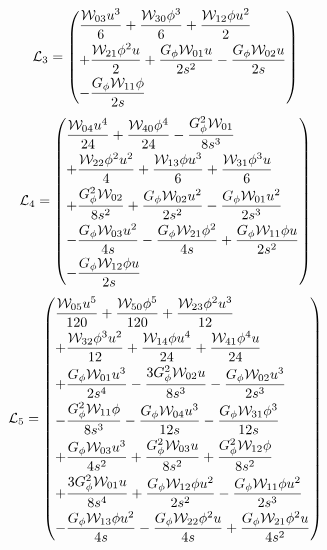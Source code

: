 \documentclass[11pt,a4paper]{article}
\begin{document}
\begin{equation}
\mathcal L_{3}=\left(\vcenter{\hbox{\shortstack[l]{$\displaystyle \frac{\mathcal W_{03} u^{3}}{6} + \frac{\mathcal W_{30} \phi^{3}}{6} + \frac{\mathcal W_{12} \phi u^{2}}{2}$\\
$\displaystyle + \frac{\mathcal W_{21} \phi^{2} u}{2} + \frac{G_{\phi} \mathcal W_{01} u}{2 s^{2}} - \frac{G_{\phi} \mathcal W_{02} u}{2 s}$\\
$\displaystyle - \frac{G_{\phi} \mathcal W_{11} \phi}{2 s}$}}}\right)
\label{eq:cat-local-L-3}
\end{equation}
\begin{equation}
\mathcal L_{4}=\left(\vcenter{\hbox{\shortstack[l]{$\displaystyle \frac{\mathcal W_{04} u^{4}}{24} + \frac{\mathcal W_{40} \phi^{4}}{24} - \frac{G_{\phi}^{2} \mathcal W_{01}}{8 s^{3}}$\\
$\displaystyle + \frac{\mathcal W_{22} \phi^{2} u^{2}}{4} + \frac{\mathcal W_{13} \phi u^{3}}{6} + \frac{\mathcal W_{31} \phi^{3} u}{6}$\\
$\displaystyle + \frac{G_{\phi}^{2} \mathcal W_{02}}{8 s^{2}} + \frac{G_{\phi} \mathcal W_{02} u^{2}}{2 s^{2}} - \frac{G_{\phi} \mathcal W_{01} u^{2}}{2 s^{3}}$\\
$\displaystyle - \frac{G_{\phi} \mathcal W_{03} u^{2}}{4 s} - \frac{G_{\phi} \mathcal W_{21} \phi^{2}}{4 s} + \frac{G_{\phi} \mathcal W_{11} \phi u}{2 s^{2}}$\\
$\displaystyle - \frac{G_{\phi} \mathcal W_{12} \phi u}{2 s}$}}}\right)
\label{eq:cat-local-L-4}
\end{equation}
\begin{equation}
\mathcal L_{5}=\left(\vcenter{\hbox{\shortstack[l]{$\displaystyle \frac{\mathcal W_{05} u^{5}}{120} + \frac{\mathcal W_{50} \phi^{5}}{120} + \frac{\mathcal W_{23} \phi^{2} u^{3}}{12}$\\
$\displaystyle + \frac{\mathcal W_{32} \phi^{3} u^{2}}{12} + \frac{\mathcal W_{14} \phi u^{4}}{24} + \frac{\mathcal W_{41} \phi^{4} u}{24}$\\
$\displaystyle + \frac{G_{\phi} \mathcal W_{01} u^{3}}{2 s^{4}} - \frac{3 G_{\phi}^{2} \mathcal W_{02} u}{8 s^{3}} - \frac{G_{\phi} \mathcal W_{02} u^{3}}{2 s^{3}}$\\
$\displaystyle - \frac{G_{\phi}^{2} \mathcal W_{11} \phi}{8 s^{3}} - \frac{G_{\phi} \mathcal W_{04} u^{3}}{12 s} - \frac{G_{\phi} \mathcal W_{31} \phi^{3}}{12 s}$\\
$\displaystyle + \frac{G_{\phi} \mathcal W_{03} u^{3}}{4 s^{2}} + \frac{G_{\phi}^{2} \mathcal W_{03} u}{8 s^{2}} + \frac{G_{\phi}^{2} \mathcal W_{12} \phi}{8 s^{2}}$\\
$\displaystyle + \frac{3 G_{\phi}^{2} \mathcal W_{01} u}{8 s^{4}} + \frac{G_{\phi} \mathcal W_{12} \phi u^{2}}{2 s^{2}} - \frac{G_{\phi} \mathcal W_{11} \phi u^{2}}{2 s^{3}}$\\
$\displaystyle - \frac{G_{\phi} \mathcal W_{13} \phi u^{2}}{4 s} - \frac{G_{\phi} \mathcal W_{22} \phi^{2} u}{4 s} + \frac{G_{\phi} \mathcal W_{21} \phi^{2} u}{4 s^{2}}$}}}\right)
\label{eq:cat-local-L-5}
\end{equation}
\end{document}
